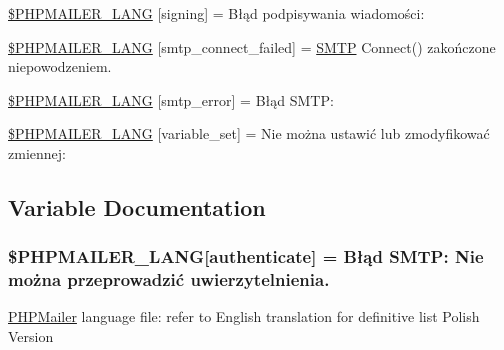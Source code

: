 \begin{DoxyCompactItemize}
\item 
\hyperlink{phpmailer_8lang-pl_8php_a68e437bdb9b968a5a67320f03d231565}{\$\+P\+H\+P\+M\+A\+I\+L\+E\+R\+\_\+\+L\+A\+NG} \mbox{[}\textquotesingle{}signing\textquotesingle{}\mbox{]} = \textquotesingle{}Błąd podpisywania wiadomości\+: \textquotesingle{}
\item 
\hyperlink{phpmailer_8lang-pl_8php_a7b321d4ca1e9df702403ed4c61aa0980}{\$\+P\+H\+P\+M\+A\+I\+L\+E\+R\+\_\+\+L\+A\+NG} \mbox{[}\textquotesingle{}smtp\+\_\+connect\+\_\+failed\textquotesingle{}\mbox{]} = \textquotesingle{}\hyperlink{class_s_m_t_p}{S\+M\+TP} Connect() zakończone niepowodzeniem.\textquotesingle{}
\item 
\hyperlink{phpmailer_8lang-pl_8php_a7d9cffba1e669c845f8a4c891ee50064}{\$\+P\+H\+P\+M\+A\+I\+L\+E\+R\+\_\+\+L\+A\+NG} \mbox{[}\textquotesingle{}smtp\+\_\+error\textquotesingle{}\mbox{]} = \textquotesingle{}Błąd S\+M\+T\+P\+: \textquotesingle{}
\item 
\hyperlink{phpmailer_8lang-pl_8php_af795debc7a739d038742691c358d9032}{\$\+P\+H\+P\+M\+A\+I\+L\+E\+R\+\_\+\+L\+A\+NG} \mbox{[}\textquotesingle{}variable\+\_\+set\textquotesingle{}\mbox{]} = \textquotesingle{}Nie można ustawić lub zmodyfikować zmiennej\+: \textquotesingle{}
\end{DoxyCompactItemize}


\subsection{Variable Documentation}
\subsubsection[{\texorpdfstring{\$\+P\+H\+P\+M\+A\+I\+L\+E\+R\+\_\+\+L\+A\+NG}{$PHPMAILER_LANG}}]{\setlength{\rightskip}{0pt plus 5cm}\$P\+H\+P\+M\+A\+I\+L\+E\+R\+\_\+\+L\+A\+NG\mbox{[}\textquotesingle{}authenticate\textquotesingle{}\mbox{]} = \textquotesingle{}Błąd S\+M\+T\+P\+: Nie można przeprowadzić uwierzytelnienia.\textquotesingle{}}\hypertarget{phpmailer_8lang-pl_8php_a2cb33073c989b85580748e331ed8b4aa}{}\label{phpmailer_8lang-pl_8php_a2cb33073c989b85580748e331ed8b4aa}
\hyperlink{class_p_h_p_mailer}{P\+H\+P\+Mailer} language file\+: refer to English translation for definitive list Polish Version 


